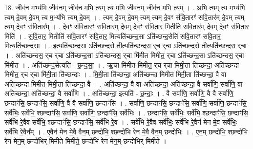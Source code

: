 \documentclass[17pt]{extarticle}
\begin{document}
18. जीव॑न म॒भ्य॑भि जीव॑न॒म् जीव॑न म॒भि त्यम् त्य म॒भि जीव॑न॒म् जीव॑न म॒भि त्यम् । . अ॒भि त्यम् त्य म॒भ्य॑भि त्यम् दे॒वम् दे॒वम् त्य म॒भ्य॑भि त्यम् दे॒वम् । . त्यम् दे॒वम् दे॒वम् त्यम् त्यम् दे॒वꣳ स॑वि॒तारꣳ॑ सवि॒तार॑म् दे॒वम् त्यम् त्यम् दे॒वꣳ स॑वि॒तार᳚म् । . दे॒वꣳ स॑वि॒तारꣳ॑ सवि॒तार॑म् दे॒वम् दे॒वꣳ स॑वि॒तार॒ मितीति॑ सवि॒तार॑म् दे॒वम् दे॒वꣳ स॑वि॒तार॒ मिति॑ । . स॒वि॒तार॒ मितीति॑ सवि॒तारꣳ॑ सवि॒तार॒ मित्यति॑च्छन्द॒सा ऽति॑च्छन्द॒सेति॑ सवि॒तारꣳ॑ सवि॒तार॒ मित्यति॑च्छन्दसा । . इत्यति॑च्छन्द॒सा ऽति॑च्छन्द॒से तीत्यति॑च्छन्दस॒ र्‌च र्‌चा ऽति॑च्छन्द॒से तीत्यति॑च्छन्दस॒ र्‌चा । . अति॑च्छन्दस॒ र्‌च र्‌चा ऽति॑च्छन्द॒सा ऽति॑च्छन्दस॒ र्‌चा मि॑मीत मिमीत॒ र्‌चा ऽति॑च्छन्द॒सा ऽति॑च्छन्दस॒ र्‌चा मि॑मीत । . अति॑च्छन्द॒सेत्यति॑ - छ॒न्द॒सा॒ । . ऋ॒चा मि॑मीत मिमीत॒ र्‌च र्‌चा मि॑मी॒ता ति॑च्छन्दा॒ अति॑च्छन्दा मिमीत॒ र्‌च र्‌चा मि॑मी॒ता ति॑च्छन्दाः । . मि॒मी॒ता ति॑च्छन्दा॒ अति॑च्छन्दा मिमीत मिमी॒ता ति॑च्छन्दा॒ वै वा अति॑च्छन्दा मिमीत मिमी॒ता ति॑च्छन्दा॒ वै । . अति॑च्छन्दा॒ वै वा अति॑च्छन्दा॒ अति॑च्छन्दा॒ वै सर्वा॑णि॒ सर्वा॑णि॒ वा अति॑च्छन्दा॒ अति॑च्छन्दा॒ वै सर्वा॑णि । . अति॑च्छन्दा॒ इत्यति॑ - छ॒न्दाः॒ । . वै सर्वा॑णि॒ सर्वा॑णि॒ वै वै सर्वा॑णि॒ छन्दाꣳ॑सि॒ छन्दाꣳ॑सि॒ सर्वा॑णि॒ वै वै सर्वा॑णि॒ छन्दाꣳ॑सि । . सर्वा॑णि॒ छन्दाꣳ॑सि॒ छन्दाꣳ॑सि॒ सर्वा॑णि॒ सर्वा॑णि॒ छन्दाꣳ॑सि॒ सर्वे॑भिः॒ सर्वे॑भि॒ श्छन्दाꣳ॑सि॒ सर्वा॑णि॒ सर्वा॑णि॒ छन्दाꣳ॑सि॒ सर्वे॑भिः । . छन्दाꣳ॑सि॒ सर्वे॑भिः॒ सर्वे॑भि॒ श्छन्दाꣳ॑सि॒ छन्दाꣳ॑सि॒ सर्वे॑भि रे॒वैव सर्वे॑भि॒ श्छन्दाꣳ॑सि॒ छन्दाꣳ॑सि॒ सर्वे॑भि रे॒व । . सर्वे॑भि रे॒वैव सर्वे॑भिः॒ सर्वे॑भि रे॒वैन॑ मेन मे॒व सर्वे॑भिः॒ सर्वे॑भि रे॒वैन᳚म् । . ए॒वैन॑ मेन मे॒वै वैन॒म् छन्दो॑भि॒ श्छन्दो॑भि रेन मे॒वै वैन॒म् छन्दो॑भिः । . ए॒न॒म् छन्दो॑भि॒ श्छन्दो॑भि रेन मेन॒म् छन्दो॑भिर् मिमीते मिमीते॒ छन्दो॑भि रेन मेन॒म् छन्दो॑भिर् मिमीते । \newline
\end{document}

